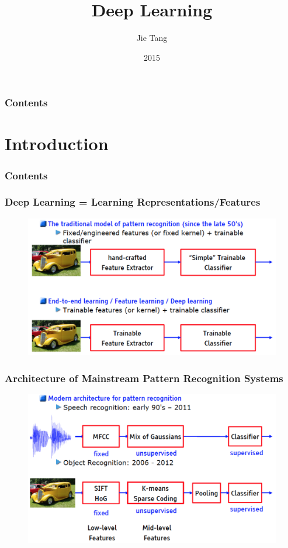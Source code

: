 \documentclass{beamer}
\begin{document}
\title{Deep Learning}
\author{Jie Tang}
\date{2015}

\begin{frame}
\titlepage
\end{frame}


\begin{frame}
  \frametitle{Contents}
  \tableofcontents
\end{frame}

\section{Introduction}

\begin{frame}
  \frametitle{Contents}
  \tableofcontents[currentsection]
\end{frame}

\begin{frame}
\frametitle{Deep Learning = Learning Representations/Features}
\begin{figure}
      \includegraphics[width=1\textwidth]{figs/intro1.png}
\end{figure}
\end{frame}

\begin{frame}
\frametitle{Architecture of Mainstream Pattern Recognition Systems}
\begin{figure}
      \includegraphics[width=1\textwidth]{figs/intro2.png}
\end{figure}
\end{frame}
\end{document}
